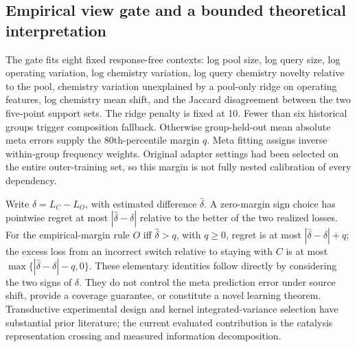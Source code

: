\subsection{Empirical view gate and a bounded theoretical interpretation}
The gate fits eight fixed response-free contexts: log pool size, log query size, log operating variation, log chemistry variation, log query chemistry novelty relative to the pool, chemistry variation unexplained by a pool-only ridge on operating features, log chemistry mean shift, and the Jaccard disagreement between the two five-point support sets. The ridge penalty is fixed at 10. Fewer than six historical groups trigger composition fallback. Otherwise group-held-out mean absolute meta errors supply the 80th-percentile margin $q$. Meta fitting assigns inverse within-group frequency weights. Original adapter settings had been selected on the entire outer-training set, so this margin is not fully nested calibration of every dependency.

Write $\delta=L_C-L_O$, with estimated difference $\widehat\delta$. A zero-margin sign choice has pointwise regret at most $|\widehat\delta-\delta|$ relative to the better of the two realized losses. For the empirical-margin rule $O$ iff $\widehat\delta>q$, with $q\geq0$, regret is at most $|\widehat\delta-\delta|+q$; the excess loss from an incorrect switch relative to staying with $C$ is at most $\max\{|\widehat\delta-\delta|-q,0\}$. These elementary identities follow directly by considering the two signs of $\delta$. They do not control the meta prediction error under source shift, provide a coverage guarantee, or constitute a novel learning theorem. Transductive experimental design and kernel integrated-variance selection have substantial prior literature\cite{yubi,gorodetsky2016}; the current evaluated contribution is the catalysis representation crossing and measured information decomposition.


\FloatBarrier


